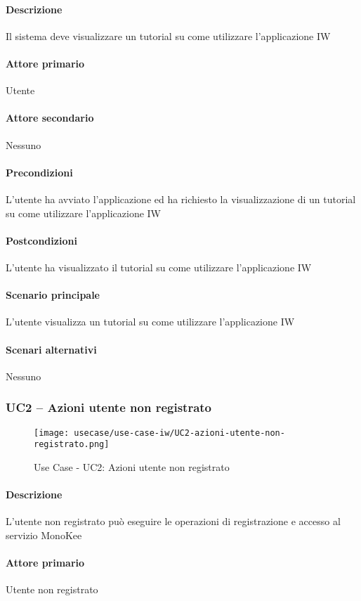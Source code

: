 \paragraph{Descrizione}  Il sistema deve visualizzare un tutorial su come utilizzare l’applicazione IW
\paragraph{Attore primario}  Utente
\paragraph{Attore secondario}  Nessuno
\paragraph{Precondizioni}  L’utente ha avviato l’applicazione ed ha richiesto la visualizzazione di un tutorial su come utilizzare l’applicazione IW
\paragraph{Postcondizioni}  L’utente ha visualizzato il tutorial su come utilizzare l’applicazione IW
\paragraph{Scenario principale}  
L’utente visualizza un tutorial su come utilizzare l’applicazione IW
\paragraph{Scenari alternativi}  Nessuno


\subsubsection{UC2 – Azioni utente non registrato}
\begin{figure}[!htbp] 
    \centering 
    \texttt{[image: usecase/use-case-iw/UC2-azioni-utente-non-registrato.png]} 
    \caption{Use Case - UC2: Azioni utente non registrato}
\end{figure}

\paragraph{Descrizione}  L’utente non registrato può eseguire le operazioni di registrazione e accesso al servizio MonoKee 
\paragraph{Attore primario}  Utente non registrato
